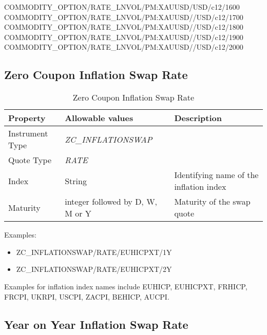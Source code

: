 COMMODITY\_OPTION/RATE\_LNVOL/PM:XAUUSD/USD/c12/1600\\
COMMODITY\_OPTION/RATE\_LNVOL/PM:XAUUSD//USD/c12/1700\\
COMMODITY\_OPTION/RATE\_LNVOL/PM:XAUUSD//USD/c12/1800\\
COMMODITY\_OPTION/RATE\_LNVOL/PM:XAUUSD//USD/c12/1900\\
COMMODITY\_OPTION/RATE\_LNVOL/PM:XAUUSD//USD/c12/2000\\



\subsection{Zero Coupon Inflation Swap Rate}

\begin{table}[H]
    \centering
    \begin{tabular}{|p{3cm}|p{3.5cm}|p{7cm}|}
      \hline
      {\bf Property} & {\bf Allowable values} & {\bf Description} \\ \hline
      Instrument Type & \emph{ZC\_INFLATIONSWAP} & \\ \hline
      Quote Type & \emph{RATE} & \\ \hline
      Index & String & Identifying name of the inflation index \\ \hline
      Maturity & integer followed by D, W, M or Y & Maturity of the swap quote \\ \hline
    \end{tabular}
    \caption{Zero Coupon Inflation Swap Rate}
    \label{tab:zcinflationswap_quote}
\end{table}

\medskip
Examples:
\begin{itemize}
\item {ZC\_INFLATIONSWAP/RATE/EUHICPXT/1Y}
\item {ZC\_INFLATIONSWAP/RATE/EUHICPXT/2Y}
\end{itemize}

Examples for inflation index names include EUHICP, EUHICPXT, FRHICP, FRCPI, UKRPI, USCPI, ZACPI, BEHICP, AUCPI.

\subsection{Year on Year Inflation Swap Rate}

